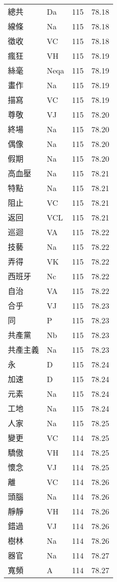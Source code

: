 \documentclass[twocolumn]{book}
\begin{document}
\begin{supertabular}{llrr}
總共 & Da & 115 &  78.18\\
線條 & Na & 115 &  78.18\\
徵收 & VC & 115 &  78.18\\
瘋狂 & VH & 115 &  78.19\\
絲毫 & Neqa & 115 &  78.19\\
畫作 & Na & 115 &  78.19\\
描寫 & VC & 115 &  78.19\\
尊敬 & VJ & 115 &  78.20\\
終場 & Na & 115 &  78.20\\
偶像 & Na & 115 &  78.20\\
假期 & Na & 115 &  78.20\\
高血壓 & Na & 115 &  78.21\\
特點 & Na & 115 &  78.21\\
阻止 & VC & 115 &  78.21\\
返回 & VCL & 115 &  78.21\\
巡迴 & VA & 115 &  78.22\\
技藝 & Na & 115 &  78.22\\
弄得 & VK & 115 &  78.22\\
西班牙 & Nc & 115 &  78.22\\
自治 & VA & 115 &  78.22\\
合乎 & VJ & 115 &  78.23\\
同 & P & 115 &  78.23\\
共產黨 & Nb & 115 &  78.23\\
共產主義 & Na & 115 &  78.23\\
永 & D & 115 &  78.24\\
加速 & D & 115 &  78.24\\
元素 & Na & 115 &  78.24\\
工地 & Na & 115 &  78.24\\
人家 & Na & 115 &  78.25\\
變更 & VC & 114 &  78.25\\
驕傲 & VH & 114 &  78.25\\
懷念 & VJ & 114 &  78.25\\
離 & VC & 114 &  78.26\\
頭腦 & Na & 114 &  78.26\\
靜靜 & VH & 114 &  78.26\\
錯過 & VJ & 114 &  78.26\\
樹林 & Na & 114 &  78.26\\
器官 & Na & 114 &  78.27\\
寬頻 & A & 114 &  78.27\\

\end{supertabular}
\end{document}
